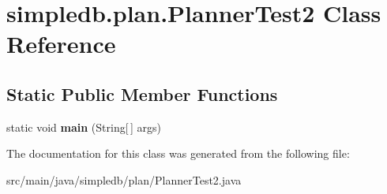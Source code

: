 \hypertarget{classsimpledb_1_1plan_1_1PlannerTest2}{}\section{simpledb.\+plan.\+Planner\+Test2 Class Reference}
\label{classsimpledb_1_1plan_1_1PlannerTest2}
\subsection*{Static Public Member Functions}
\begin{DoxyCompactItemize}
\item 
\mbox{\label{classsimpledb_1_1plan_1_1PlannerTest2_af088a0a89856aa633addbb0694102ba5}} 
static void {\bfseries main} (String\mbox{[}$\,$\mbox{]} args)
\end{DoxyCompactItemize}


The documentation for this class was generated from the following file\+:\begin{DoxyCompactItemize}
\item 
src/main/java/simpledb/plan/Planner\+Test2.\+java\end{DoxyCompactItemize}
